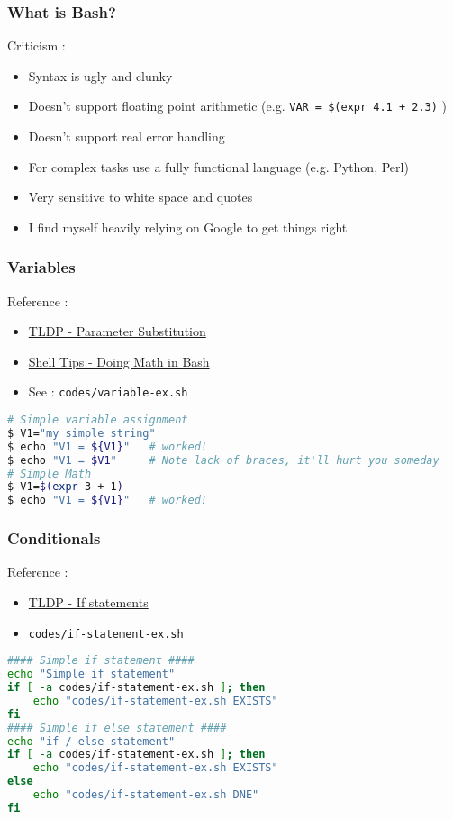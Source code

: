 \documentclass{beamer}
\newcommand{\code}[1]{\colorbox{codegray}{\texttt{#1}}}
\begin{document}
\begin{frame}
\frametitle{What is Bash?}
Criticism : 
\begin{itemize}
    \item Syntax is ugly and clunky
    \pause
    \item Doesn't support floating point arithmetic (e.g. \code{VAR = \$(expr 4.1 + 2.3)} )
    \pause
    \item Doesn't support real error handling
    \pause
    \item For complex tasks use a fully functional language (e.g. Python, Perl)
    \pause
    \item Very sensitive to white space and quotes
    \pause
    \item I find myself heavily relying on Google to get things right
\end{itemize}
\end{frame}



\begin{frame}[fragile]
\frametitle{Variables}
Reference :
\begin{itemize}
    \item \href{https://tldp.org/LDP/abs/html/parameter-substitution.html}{TLDP - Parameter Substitution}
    \pause
    \item \href{https://www.shell-tips.com/bash/math-arithmetic-calculation/}{Shell Tips - Doing Math in Bash}
    \pause
    \item See : \code{codes/variable-ex.sh}
\end{itemize}
\begingroup
\scriptsize
\begin{lstlisting}[backgroundcolor = \color{codegray}, language = Bash, showstringspaces=false]
# Simple variable assignment
$ V1="my simple string"
$ echo "V1 = ${V1}"   # worked!
$ echo "V1 = $V1"     # Note lack of braces, it'll hurt you someday
# Simple Math
$ V1=$(expr 3 + 1)
$ echo "V1 = ${V1}"   # worked! 
\end{lstlisting}
\endgroup
\end{frame}


\begin{frame}[fragile]
\frametitle{Conditionals}
Reference :
\begin{itemize}
    \item \href{https://tldp.org/LDP/Bash-Beginners-Guide/html/sect_07_01.html}{TLDP - If statements}
    \pause
    \item \code{codes/if-statement-ex.sh}
\end{itemize}
\begingroup
\scriptsize
\begin{lstlisting}[backgroundcolor = \color{codegray}, language = Bash, showstringspaces=false]
#### Simple if statement ####
echo "Simple if statement"
if [ -a codes/if-statement-ex.sh ]; then    
    echo "codes/if-statement-ex.sh EXISTS"
fi
#### Simple if else statement ####
echo "if / else statement"
if [ -a codes/if-statement-ex.sh ]; then   
    echo "codes/if-statement-ex.sh EXISTS"
else
    echo "codes/if-statement-ex.sh DNE"
fi
\end{lstlisting}
\endgroup
\end{frame}
\end{document}
